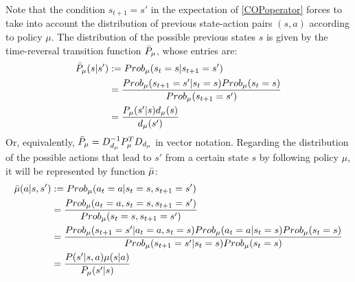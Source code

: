 \documentclass[12pt,a4paper,openright,twoside]{article}
\numberwithin{equation}{section}
\theoremstyle{definition}
\theoremstyle{remark}
\theoremstyle{plain}
\begin{document}
Note that the condition $s_{t+1} = s'$ in the expectation of \ref{COPoperator} forces to take into account the distribution of previous state-action pairs $(s,a)$ according to policy $\mu$. The distribution of the possible previous states $s$ is given by the time-reversal transition function $\Bar{P}_\mu$, whose entries are:
\begin{equation}
\begin{split}
    \Bar{P}_\mu (s | s') &:= Prob_\mu (s_t = s | s_{t+1} = s') \\
    &= \frac{Prob_\mu ( s_{t+1} = s' | s_t = s) Prob_\mu(s_t=s)}{Prob_\mu ( s_{t+1} = s')} \\
    &= \frac{P_\mu (s' | s) d_\mu(s)}{d_\mu(s')} 
\end{split}
\end{equation}
Or, equivalently, $ \Bar{P}_\mu = D_{d_\mu}^{-1}P_\mu^T D_{d_\mu}$ in vector notation. Regarding the distribution of the possible actions that lead to $s'$ from a certain state $s$ by following policy $\mu$, it will be represented by function $\Bar{\mu}$:  
\begin{equation}
\begin{split}
        \Bar{\mu}(a|s,s') &:= Prob_\mu(a_t=a | s_t = s, s_{t+1}=s') \\
        &= \frac{Prob_\mu (a_t=a, s_t = s, s_{t+1}=s')}{Prob_\mu (s_t = s, s_{t+1}=s')} \\
        &= \frac{Prob_\mu (s_{t+1}=s' | a_t=a, s_t = s) Prob_\mu (a_t=a | s_t = s) Prob_\mu (s_t = s)}{Prob_\mu (s_{t+1}=s' | s_t = s) Prob_\mu (s_t = s)} \\
        &= \frac{P(s'|s,a)\mu(s|a)}{P_\mu (s'|s)}
\end{split}
\end{equation}
\end{document}

